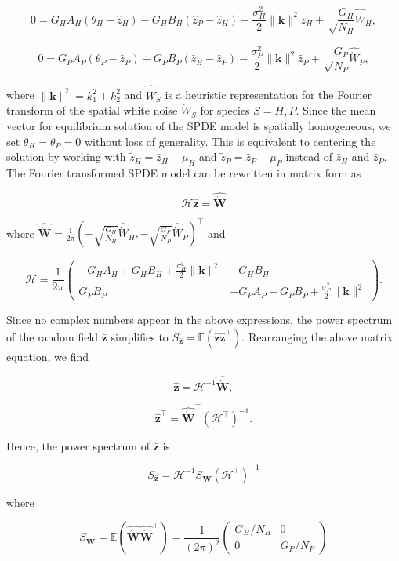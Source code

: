 \documentclass{article}
\begin{document}
\[0=G_HA_H(\theta_H-\hat z_H)-G_HB_H(\hat z_P-\hat z_H)-\frac{\sigma_H^2}{2}\|\pmb k\|^2\hat z_H+\sqrt\frac{G_H}{N_H}\widehat{\dot W}_H,\]

\[0=G_PA_P(\theta_P-\hat z_P)+G_PB_P(\hat z_H-\hat z_P)-\frac{\sigma_P^2}{2}\|\pmb k\|^2\hat z_P+\sqrt\frac{G_P}{N_P}\widehat{\dot W}_P,\]

where \(\|\pmb k\|^2=k_1^2+k_2^2\) and \(\widehat{\dot W}_S\) is a
heuristic representation for the Fourier transform of the spatial white
noise \(\dot W_S\) for species \(S=H,P\). Since the mean vector for
equilibrium solution of the SPDE model is spatially homogeneous, we set
\(\theta_H=\theta_P=0\) without loss of generality. This is equivalent
to centering the solution by working with \(\tilde z_H=\bar z_H-\mu_H\)
and \(\tilde z_P=\bar z_P-\mu_P\) instead of \(\bar z_H\) and
\(\bar z_P\). The Fourier transformed SPDE model can be rewritten in
matrix form as

\[\mathscr H\hat{\pmb z}=\widehat{\dot{\pmb W}}\]

where
\(\widehat{\dot{\pmb W}}=\tfrac{1}{2\pi}\left(-\sqrt{\tfrac{G_H}{N_H}}\hat{\dot W}_H, -\sqrt{\tfrac{G_P}{N_P}}\hat{\dot W}_P\right)^\top\)
and

\[\mathscr H=\frac{1}{2\pi}\left(\begin{matrix}-G_HA_H+G_HB_H+\frac{\sigma_H^2}{2}\|\pmb k\|^2 & -G_HB_H \\ G_PB_P & -G_PA_P-G_PB_P+\frac{\sigma_P^2}{2}\|\pmb k\|^2\end{matrix}\right).\]

Since no complex numbers appear in the above expressions, the power
spectrum of the random field \(\bar{\pmb z}\) simplifies to
\(S_{\bar{\pmb z}}=\mathbb E\left(\hat{\pmb z}\hat{\pmb z}^\top\right)\).
Rearranging the above matrix equation, we find

\[\hat{\pmb z}=\mathscr H^{-1}\widehat{\dot{\pmb W}},\]

\[\hat{\pmb z}^\top=\widehat{\dot{\pmb W}}^\top\left(\mathscr H^\top\right)^{-1}.\]

Hence, the power spectrum of \(\bar{\pmb z}\) is

\[S_{\bar{\pmb z}}=\mathscr H^{-1}S_{\dot{\pmb W}}\left(\mathscr H^\top\right)^{-1}\]

where

\[S_{\dot{\pmb W}}=\mathbb E\left(\widehat{\dot{\pmb W}}\widehat{\dot{\pmb W}}^\top\right)=\frac{1}{(2\pi)^2}\left(\begin{matrix}G_H/N_H & 0 \\ 0 & G_P/N_P \end{matrix}\right)\]
\end{document}
